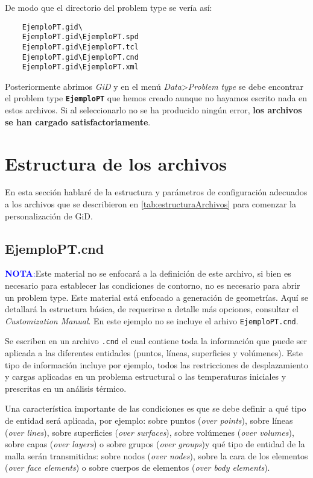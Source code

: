 \documentclass[10pt, a4paper, twocolumn]{article} %
\begin{document}
De modo que el directorio del problem type se vería así:

\begin{verbatim}
	EjemploPT.gid\
	EjemploPT.gid\EjemploPT.spd
	EjemploPT.gid\EjemploPT.tcl
	EjemploPT.gid\EjemploPT.cnd
	EjemploPT.gid\EjemploPT.xml
\end{verbatim}

Posteriormente abrimos \textit{GiD} y en el menú \textit{Data}>\textit{Problem type} se debe encontrar el problem type \textbf{\texttt{EjemploPT}} que hemos creado aunque no hayamos escrito nada en estos archivos. Si al seleccionarlo no se ha producido ningún error, \textbf{los archivos se han cargado satisfactoriamente}.

\section{Estructura de los archivos}

En esta sección hablaré de la estructura y parámetros de configuración adecuados a los archivos que se describieron en \ref{tab:estructuraArchivos} para comenzar la personalización de GiD.

\subsection{EjemploPT.cnd}

\textcolor{blue}{\textbf{NOTA}:}Este material no se enfocará a la definición de este archivo, si bien es necesario para establecer las condiciones de contorno, no es necesario para abrir un problem type. Este material está enfocado a generación de geometrías. Aquí se detallará la estructura básica, de requerirse a detalle más opciones, consultar el \textit{Customization Manual}. En este ejemplo no se incluye el arhivo \texttt{EjemploPT.cnd}.

Se escriben en un archivo \texttt{.cnd} el cual contiene toda la información que puede ser aplicada a las diferentes entidades (puntos, líneas, superficies y volúmenes). Este tipo de información incluye por ejemplo, todos las restricciones de desplazamiento y cargas aplicadas en un problema estructural o las temperaturas iniciales y prescritas en un análisis térmico.

Una característica importante de las condiciones es que se debe definir a qué tipo de entidad será aplicada, por ejemplo: sobre puntos (\textit{over points}), sobre líneas (\textit{over lines}), sobre superficies (\textit{over surfaces}), sobre volúmenes (\textit{over volumes}), sobre capas (\textit{over layers}) o sobre grupos (\textit{over groups})y qué tipo de entidad de la malla serán transmitidas: sobre nodos (\textit{over nodes}), sobre la cara de los elementos (\textit{over face elements}) o sobre cuerpos de elementos (\textit{over body elements}).
\end{document}

